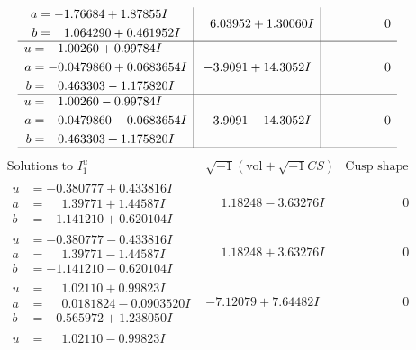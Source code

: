 \documentclass[1p]{elsarticle_modified}
\theoremstyle{definition}
\newcommand{\I}{\sqrt{-1}}
\begin{document}
$$\begin{array}{c|c|c}
\begin{aligned}
a &= -1.76684 + 1.87855 I \\
b &= \phantom{-}1.064290 + 0.461952 I\end{aligned}
 & \phantom{-}6.03952 + 1.30060 I & \phantom{-0.000000 } 0 \\ \hline\begin{aligned}
u &= \phantom{-}1.00260 + 0.99784 I \\
a &= -0.0479860 + 0.0683654 I \\
b &= \phantom{-}0.463303 - 1.175820 I\end{aligned}
 & -3.9091 + 14.3052 I & \phantom{-0.000000 } 0 \\ \hline\begin{aligned}
u &= \phantom{-}1.00260 - 0.99784 I \\
a &= -0.0479860 - 0.0683654 I \\
b &= \phantom{-}0.463303 + 1.175820 I\end{aligned}
 & -3.9091 - 14.3052 I & \phantom{-0.000000 } 0\\
 \hline 
 \end{array}$$\newpage$$\begin{array}{c|c|c}  
\text{Solutions to }I^u_{1}& \I (\text{vol} + \sqrt{-1}CS) & \text{Cusp shape}\\
 \hline 
\begin{aligned}
u &= -0.380777 + 0.433816 I \\
a &= \phantom{-}1.39771 + 1.44587 I \\
b &= -1.141210 + 0.620104 I\end{aligned}
 & \phantom{-}1.18248 - 3.63276 I & \phantom{-0.000000 } 0 \\ \hline\begin{aligned}
u &= -0.380777 - 0.433816 I \\
a &= \phantom{-}1.39771 - 1.44587 I \\
b &= -1.141210 - 0.620104 I\end{aligned}
 & \phantom{-}1.18248 + 3.63276 I & \phantom{-0.000000 } 0 \\ \hline\begin{aligned}
u &= \phantom{-}1.02110 + 0.99823 I \\
a &= \phantom{-}0.0181824 - 0.0903520 I \\
b &= -0.565972 + 1.238050 I\end{aligned}
 & -7.12079 + 7.64482 I & \phantom{-0.000000 } 0 \\ \hline\begin{aligned}
u &= \phantom{-}1.02110 - 0.99823 I \\

\end{aligned}
\end{array}$$
\end{document}

